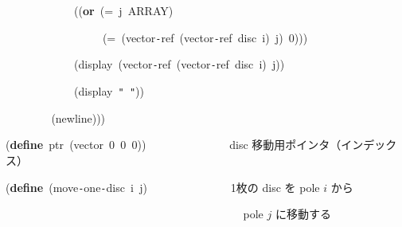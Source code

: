 \documentclass[a4paper,10pt]{article}
\def\mc{\relax}
\begin{document}
\noindent
\mbox{}{\tt\mc \ }{\tt\mc \ }{\tt\mc \ }{\tt\mc \ }{\tt\mc \ }{\tt\mc \ }{\tt\mc \ }{\tt\mc \ }{\tt\mc \ }{\tt\mc \ }{\tt\mc \ }{\tt\mc \ }((\textbf{or}{\tt\mc \ }(={\tt\mc \ }j{\tt\mc \ }ARRAY)

\noindent
\mbox{}{\tt\mc \ }{\tt\mc \ }{\tt\mc \ }{\tt\mc \ }{\tt\mc \ }{\tt\mc \ }{\tt\mc \ }{\tt\mc \ }{\tt\mc \ }{\tt\mc \ }{\tt\mc \ }{\tt\mc \ }{\tt\mc \ }{\tt\mc \ }{\tt\mc \ }{\tt\mc \ }{\tt\mc \ }(={\tt\mc \ }(vector{\tt -}ref{\tt\mc \ }(vector{\tt -}ref{\tt\mc \ }disc{\tt\mc \ }i){\tt\mc \ }j){\tt\mc \ }0)))

\noindent
\mbox{}{\tt\mc \ }{\tt\mc \ }{\tt\mc \ }{\tt\mc \ }{\tt\mc \ }{\tt\mc \ }{\tt\mc \ }{\tt\mc \ }{\tt\mc \ }{\tt\mc \ }{\tt\mc \ }{\tt\mc \ }(display{\tt\mc \ }(vector{\tt -}ref{\tt\mc \ }(vector{\tt -}ref{\tt\mc \ }disc{\tt\mc \ }i){\tt\mc \ }j))

\noindent
\mbox{}{\tt\mc \ }{\tt\mc \ }{\tt\mc \ }{\tt\mc \ }{\tt\mc \ }{\tt\mc \ }{\tt\mc \ }{\tt\mc \ }{\tt\mc \ }{\tt\mc \ }{\tt\mc \ }{\tt\mc \ }(display{\tt\mc \ }{\tt "}{\tt\mc \ }{\tt "}))

\noindent
\mbox{}{\tt\mc \ }{\tt\mc \ }{\tt\mc \ }{\tt\mc \ }{\tt\mc \ }{\tt\mc \ }{\tt\mc \ }{\tt\mc \ }(newline)))

\noindent
\mbox{}\hfill

\noindent
\mbox{}(\textbf{define}{\tt\mc \ }ptr{\tt\mc \ }(vector{\tt\mc \ }0{\tt\mc \ }0{\tt\mc \ }0)){\tt\mc \ }{\tt\mc \ }{\tt\mc \ }{\tt\mc \ }{\tt\mc \ }{\tt\mc \ }{\tt\mc \ }{\tt\mc \ }{\tt\mc \ }{\tt\mc \ }{\tt\mc \ }{\tt\mc \ }{\tt\mc \ }\rm\mc {\tt ;} \ disc 移動用ポインタ（インデックス）\hfill
\tt\mc 

\noindent
\mbox{}\hfill

\noindent
\mbox{}(\textbf{define}{\tt\mc \ }(move{\tt -}one{\tt -}disc{\tt\mc \ }i{\tt\mc \ }j){\tt\mc \ }{\tt\mc \ }{\tt\mc \ }{\tt\mc \ }{\tt\mc \ }{\tt\mc \ }{\tt\mc \ }{\tt\mc \ }{\tt\mc \ }{\tt\mc \ }{\tt\mc \ }{\tt\mc \ }{\tt\mc \ }\rm\mc {\tt ;} \ 1枚の disc を pole $i$ から\hfill
\tt\mc 

\noindent
\mbox{}{\tt\mc \ }{\tt\mc \ }{\tt\mc \ }{\tt\mc \ }{\tt\mc \ }{\tt\mc \ }{\tt\mc \ }{\tt\mc \ }{\tt\mc \ }{\tt\mc \ }{\tt\mc \ }{\tt\mc \ }{\tt\mc \ }{\tt\mc \ }{\tt\mc \ }{\tt\mc \ }{\tt\mc \ }{\tt\mc \ }{\tt\mc \ }{\tt\mc \ }{\tt\mc \ }{\tt\mc \ }{\tt\mc \ }{\tt\mc \ }{\tt\mc \ }{\tt\mc \ }{\tt\mc \ }{\tt\mc \ }{\tt\mc \ }{\tt\mc \ }{\tt\mc \ }{\tt\mc \ }{\tt\mc \ }{\tt\mc \ }{\tt\mc \ }{\tt\mc \ }{\tt\mc \ }{\tt\mc \ }{\tt\mc \ }{\tt\mc \ }\rm\mc {\tt ;} \ pole $j$ に移動する \hfill
\tt\mc 
\end{document}
